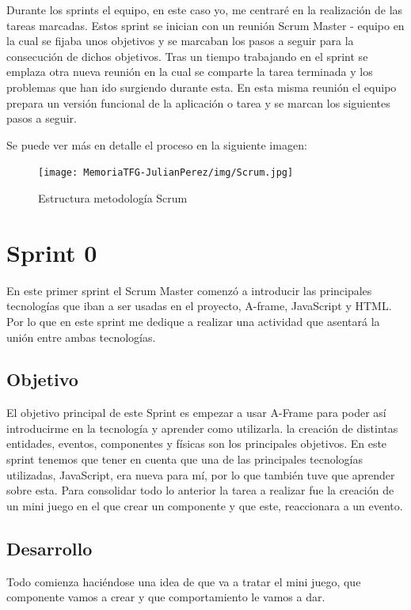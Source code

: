 \documentclass[a4paper, 12pt]{book}
\begin{document}
Durante los sprints el equipo, en este caso yo, me centraré en la realización de las tareas marcadas. Estos sprint se inician con un reunión Scrum Master - equipo en la cual se fijaba unos objetivos y se marcaban los pasos a seguir para la consecución de dichos objetivos. Tras un tiempo trabajando en el sprint se emplaza otra nueva reunión en la cual se comparte la tarea terminada y los problemas que han ido surgiendo durante esta. En esta misma reunión el equipo prepara un versión funcional de la aplicación o tarea y se marcan los siguientes pasos a seguir. 

Se puede ver más en detalle el proceso en la siguiente imagen:
\begin{figure}[H]
  \centering
  \texttt{[image: MemoriaTFG-JulianPerez/img/Scrum.jpg]}
  \caption{Estructura metodología Scrum}\label{scrum}
\end{figure}

\section{Sprint 0} %
\label{sec:sprint0}
En este primer sprint el Scrum Master comenzó a introducir las principales tecnologías que iban a ser usadas en el proyecto, A-frame, JavaScript y HTML. Por lo que en este sprint me dedique a realizar una actividad que asentará la unión entre ambas tecnologías.

\subsection{Objetivo}
El objetivo principal de este Sprint es empezar a usar A-Frame para poder así introducirme en la tecnología y aprender como utilizarla. la creación de distintas entidades, eventos, componentes y físicas son los principales objetivos. En este sprint tenemos que tener en cuenta que una de las principales tecnologías utilizadas, JavaScript, era nueva para mí, por lo que también tuve que aprender sobre esta. Para consolidar todo lo anterior la tarea a realizar fue la creación de un mini juego en el que crear un componente y que este, reaccionara a un evento.

\subsection{Desarrollo}
Todo comienza haciéndose una idea de que va a tratar el mini juego, que componente vamos a crear y que comportamiento le vamos a dar.
\end{document}
